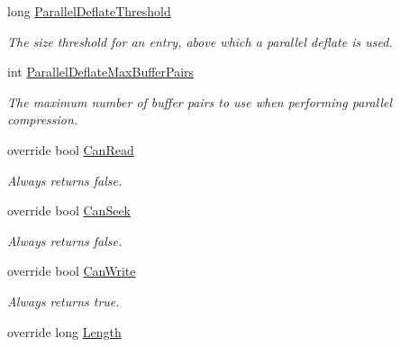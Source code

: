 \begin{DoxyCompactItemize}
long \mbox{\hyperlink{class_super_tiled2_unity_1_1_ionic_1_1_zip_1_1_zip_output_stream_a9918f5fa946840eb0ffee089ce5485b8}{Parallel\+Deflate\+Threshold}}
\begin{DoxyCompactList}\small\item\em The size threshold for an entry, above which a parallel deflate is used. \end{DoxyCompactList}\item 
int \mbox{\hyperlink{class_super_tiled2_unity_1_1_ionic_1_1_zip_1_1_zip_output_stream_ad5f3ac0c07bfd366b2f6f7a1afbc2f18}{Parallel\+Deflate\+Max\+Buffer\+Pairs}}
\begin{DoxyCompactList}\small\item\em The maximum number of buffer pairs to use when performing parallel compression. \end{DoxyCompactList}\item 
override bool \mbox{\hyperlink{class_super_tiled2_unity_1_1_ionic_1_1_zip_1_1_zip_output_stream_a36555d45a504b89f5889813fc30e70d3}{Can\+Read}}
\begin{DoxyCompactList}\small\item\em Always returns false. \end{DoxyCompactList}\item 
override bool \mbox{\hyperlink{class_super_tiled2_unity_1_1_ionic_1_1_zip_1_1_zip_output_stream_a7f9b59591fb70d15dea656f96dcf6f72}{Can\+Seek}}
\begin{DoxyCompactList}\small\item\em Always returns false. \end{DoxyCompactList}\item 
override bool \mbox{\hyperlink{class_super_tiled2_unity_1_1_ionic_1_1_zip_1_1_zip_output_stream_aeb54240dd7abcb178c421bca5baf650e}{Can\+Write}}
\begin{DoxyCompactList}\small\item\em Always returns true. \end{DoxyCompactList}\item 
override long \mbox{\hyperlink{class_super_tiled2_unity_1_1_ionic_1_1_zip_1_1_zip_output_stream_aca9775b4fa968157ae513542b4ccefbe}{Length}}

\end{DoxyCompactItemize}
